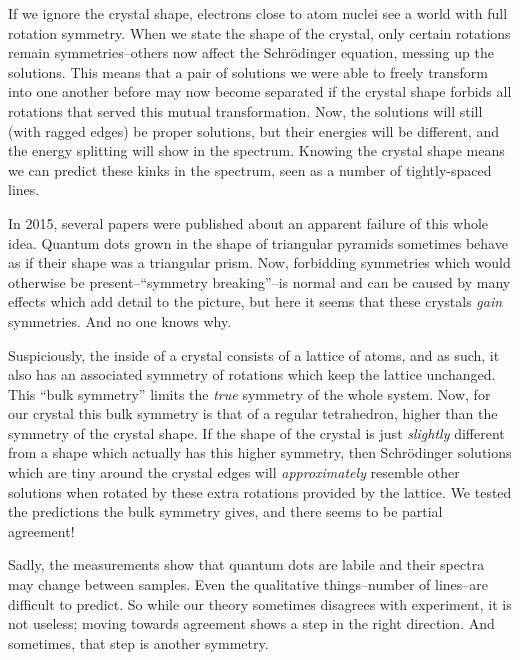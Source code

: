 If we ignore the crystal shape, electrons close to atom nuclei see a world with full rotation symmetry. When we state the shape of the crystal, only certain rotations remain symmetries--others now affect the Schrödinger equation, messing up the solutions. This means that a pair of solutions we were able to freely transform into one another before may now become separated if the crystal shape forbids all rotations that served this mutual transformation. Now, the solutions will still (with ragged edges) be proper solutions, but their energies will be different, and the energy splitting will show in the spectrum. Knowing the crystal shape means we can predict these kinks in the spectrum, seen as a number of tightly-spaced lines.

In 2015, several papers were published about an apparent failure of this whole idea. Quantum dots grown in the shape of triangular pyramids sometimes behave as if their shape was a triangular prism. Now, forbidding symmetries which would otherwise be present--``symmetry breaking''--is normal and can be caused by many effects which add detail to the picture, but here it seems that these crystals \textit{gain} symmetries. And no one knows why.

Suspiciously, the inside of a crystal consists of a lattice of atoms, and as such, it also has an associated symmetry of rotations which keep the lattice unchanged. This ``bulk symmetry'' limits the \textit{true} symmetry of the whole system. Now, for our crystal this bulk symmetry is that of a regular tetrahedron, higher than the symmetry of the crystal shape. If the shape of the crystal is just \textit{slightly} different from a shape which actually has this higher symmetry, then Schrödinger solutions which are tiny around the crystal edges will \textit{approximately} resemble other solutions when rotated by these extra rotations provided by the lattice. We tested the predictions the bulk symmetry gives, and there seems to be partial agreement!

Sadly, the measurements show that quantum dots are labile and their spectra may change between samples. Even the qualitative things--number of lines--are difficult to predict. So while our theory sometimes disagrees with experiment, it is not useless; moving towards agreement shows a step in the right direction. And sometimes, that step is another symmetry.

\restoregeometry